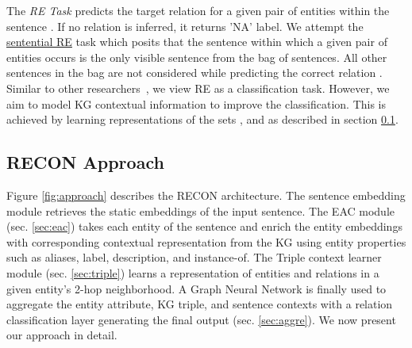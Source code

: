 \documentclass[sigconf]{acmart}
\begin{document}
The \textit{RE Task} predicts the target relation  for a given pair of entities  within the sentence .
If no relation is inferred, it returns 'NA' label.
We attempt the \underline{sentential RE} task which posits that the sentence within which a given pair of entities occurs is the only visible sentence from the bag of sentences. 
All other sentences in the bag are not considered while predicting the correct relation . Similar to other researchers~\cite{DBLP:conf/emnlp/SorokinG17}, we view RE as a classification task. However, we aim to model KG contextual information to improve the classification. This is achieved by learning representations of the sets ,  and  as described in section \ref{sec:approach}.




















\subsection{RECON Approach} \label{sec:approach}
Figure \ref{fig:approach} describes the RECON architecture. The sentence embedding module retrieves the static embeddings of the input sentence. The EAC module (sec. \ref{sec:eac}) takes each entity of the sentence and enrich the entity embeddings with corresponding contextual representation from the KG using entity properties such as aliases, label, description, and instance-of. The Triple context learner module (sec. \ref{sec:triple}) learns a representation of entities and relations in a given entity’s 2-hop neighborhood. A Graph Neural Network is finally used to aggregate the entity attribute, KG triple, and sentence contexts with a relation classification layer generating the final output (sec. \ref{sec:aggre}).
We now present our approach in detail.
\end{document}
